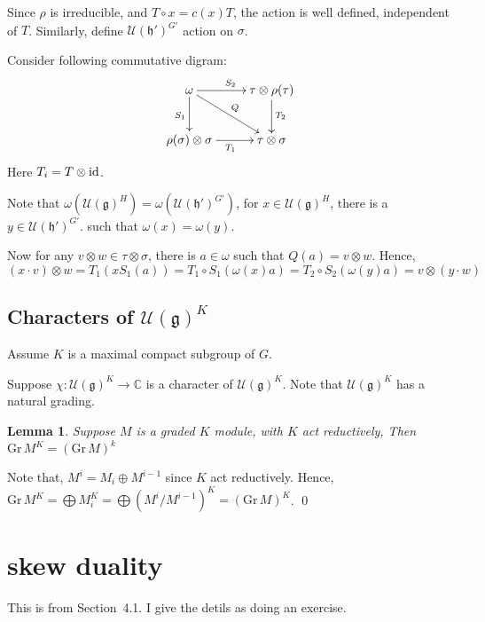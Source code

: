 \documentclass[12pt]{article}
\newtheorem{lemma}{Lemma}
\def\bC{{\mathbb{C}}}
\def\id{{\rm id}}
\def\fhh{\mathfrak{h}}
\def\fgg{\mathfrak{g}}
\def\cuu{\mathcal{U}}
\def\Gr{\mathrm{Gr\,}}
\begin{document}
Since $\rho$ is irreducible, and $T\circ x = c(x) T$, 
the action is well defined, independent of $T$. 
Similarly, define $\cuu(\fhh')^{G'}$ action on $\sigma$.

Consider following commutative digram:
\[
\xymatrix{
\omega \ar[r]^{S_2} \ar[d]_{S_1}\ar[dr]^{Q} & \tau\otimes \rho(\tau)\ar[d]^{T_2}\\
\rho(\sigma)\otimes \sigma\ar[r]_{T_1} & \tau\otimes \sigma 
}
\]
Here $T_i = T\otimes \id$.

Note that $\omega(\cuu(\fgg)^H) = \omega(\cuu(\fhh')^{G'})$,
for $x\in \cuu(\fgg)^H$, 
there is a $y\in \cuu(\fhh')^{G'}$.
such that $\omega(x) = \omega(y)$.


Now for any $v\otimes w\in \tau\otimes \sigma$, there is $a\in \omega$ such
that $Q(a) = v\otimes w$.
Hence, 
\[
(x \cdot v)\otimes w 
= T_1 (x S_1 (a))
= T_1 \circ S_1 (\omega(x) a)
= T_2 \circ S_2 (\omega(y) a)
= v\otimes (y\cdot w) 
\]

\subsection{Characters of $\cuu(\fgg)^K$}
Assume $K$ is a maximal compact subgroup of $G$.

Suppose $\chi\colon \cuu(\fgg)^K \to \bC$ is a character of $\cuu(\fgg)^K$. 
Note that $\cuu(\fgg)^K$ has a natural grading. 


\begin{lemma}
Suppose $M$ is a graded $K$ module, with $K$ act reductively, 
Then $\Gr M^K = (\Gr M)^k$
\end{lemma}
\proof Note that, $M^i = M_i \oplus M^{i-1}$ since $K$ act reductively.
Hence, $\Gr M^K = \bigoplus M_i^K  = \bigoplus (M^i/M^{i-1})^K= (\Gr M)^K$. \qed

\section{skew duality}
This is from \cite{Howe1995perspective} Section~4.1. 
I give the detils as doing an  exercise.
\end{document}
